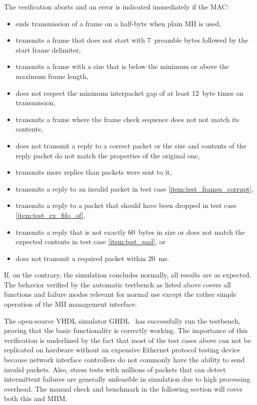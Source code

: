 \documentclass[a4paper, 11pt, oneside]{Thesis}  %
\begin{document}
The verification aborts and an error is indicated immediately if the MAC:
\begin{itemize}
\item ends transmission of a frame on a half-byte when plain MII is used,
\item transmits a frame that does not start with 7~preamble bytes followed by the start frame delimiter,
\item transmits a frame with a size that is below the minimum or above the maximum frame length,
\item does not respect the minimum interpacket gap of at least 12~byte times on transmission,
\item transmits a frame where the frame check sequence does not not match its contents,
\item does not transmit a reply to a correct packet or the size and contents of the reply packet do not match the properties of the original one,
\item transmits more replies than packets were sent to it,
\item transmits a reply to an invalid packet in test case \ref{item:test_frames_corrupt},
\item transmits a reply to a packet that should have been dropped in test case \ref{item:test_rx_fifo_of},
\item transmits a reply that is not exactly 60~bytes in size or does not match the expected contents in test case \ref{item:test_pad}, or
\item does not transmit a required packet within 20~ms.
\end{itemize}

If, on the contrary, the simulation concludes normally, all results are as expected. The behavior verified by the automatic testbench as listed above covers all functions and failure modes relevant for normal use except the rather simple operation of the MII management interface.

The open-source VHDL simulator GHDL~\cite{GHDL} has successfully run the testbench, proving that the basic functionality is correctly working. The importance of this verification is underlined by the fact that most of the test cases above can not be replicated on hardware without an expensive Ethernet protocol testing device because network interface controllers do not commonly have the ability to send invalid packets. Also, stress tests with millions of packets that can detect intermittent failures are generally unfeasible in simulation due to high processing overhead. The manual check and benchmark in the following section will cover both this and MIIM.
\end{document}
